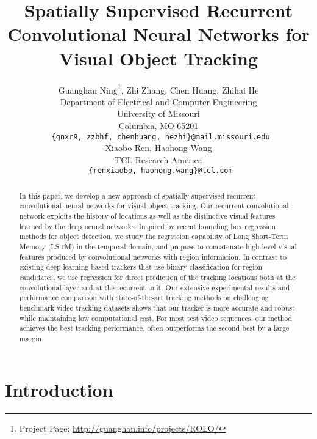 \documentclass{article}
\title{Spatially Supervised Recurrent Convolutional Neural Networks for Visual Object Tracking}
\author{
  Guanghan Ning\thanks{Project Page: 
  	\href{http://guanghan.info/projects/ROLO/}{http://guanghan.info/projects/ROLO/}}, Zhi Zhang, Chen Huang, Zhihai He \\ 
  Department of Electrical and Computer Engineering\\
  University of Missouri\\
  Columbia, MO 65201 \\
  \texttt{ \{gnxr9, zzbhf, chenhuang, hezhi\}@mail.missouri.edu} \\
\And
Xiaobo Ren, Haohong Wang \\
  TCL Research America\\
  \texttt{ \{renxiaobo, haohong.wang\}@tcl.com} \\
}
\begin{document}
 
\maketitle

\begin{abstract}
In this paper, we develop a new approach of spatially supervised recurrent convolutional neural networks for visual object tracking.  Our recurrent convolutional network exploits the history of locations as well as the distinctive visual features learned by the deep neural networks. 
Inspired by recent bounding box regression methods for object detection, we study  the regression capability of Long Short-Term Memory (LSTM) in the temporal domain, and propose to concatenate high-level visual features produced by convolutional networks with region information. In contrast to existing deep learning based trackers that use binary classification for region candidates, we use regression for  direct prediction of the tracking locations both at the convolutional layer and at the recurrent unit.  Our extensive experimental results and performance comparison  with  state-of-the-art tracking methods on challenging benchmark video tracking datasets shows that our tracker is more accurate and robust while maintaining low computational cost. For most test video sequences, our method achieves the best tracking performance, often outperforms the second best by a large margin. 

\end{abstract}

\section{Introduction}
\label{intro}
\end{document}
